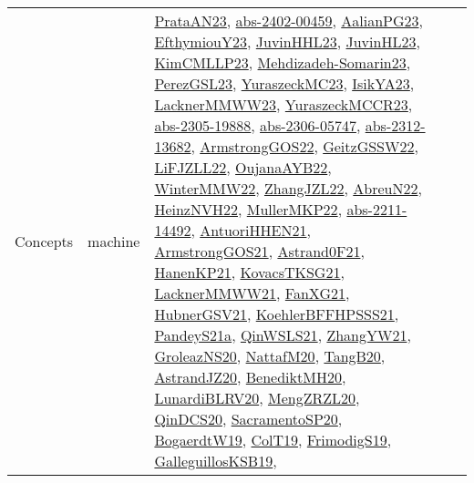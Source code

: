 {\begin{longtable}{llp{6cm}p{6cm}p{6cm}}
Concepts & machine & \href{articles/PrataAN23.pdf}{PrataAN23}\cite{PrataAN23}, \href{articles/abs-2402-00459.pdf}{abs-2402-00459}\cite{abs-2402-00459}, \href{papers/AalianPG23.pdf}{AalianPG23}\cite{AalianPG23}, \href{papers/EfthymiouY23.pdf}{EfthymiouY23}\cite{EfthymiouY23}, \href{papers/JuvinHHL23.pdf}{JuvinHHL23}\cite{JuvinHHL23}, \href{papers/JuvinHL23.pdf}{JuvinHL23}\cite{JuvinHL23}, \href{papers/KimCMLLP23.pdf}{KimCMLLP23}\cite{KimCMLLP23}, \href{papers/Mehdizadeh-Somarin23.pdf}{Mehdizadeh-Somarin23}\cite{Mehdizadeh-Somarin23}, \href{papers/PerezGSL23.pdf}{PerezGSL23}\cite{PerezGSL23}, \href{papers/YuraszeckMC23.pdf}{YuraszeckMC23}\cite{YuraszeckMC23}, \href{articles/IsikYA23.pdf}{IsikYA23}\cite{IsikYA23}, \href{articles/LacknerMMWW23.pdf}{LacknerMMWW23}\cite{LacknerMMWW23}, \href{articles/YuraszeckMCCR23.pdf}{YuraszeckMCCR23}\cite{YuraszeckMCCR23}, \href{articles/abs-2305-19888.pdf}{abs-2305-19888}\cite{abs-2305-19888}, \href{articles/abs-2306-05747.pdf}{abs-2306-05747}\cite{abs-2306-05747}, \href{articles/abs-2312-13682.pdf}{abs-2312-13682}\cite{abs-2312-13682}, \href{papers/ArmstrongGOS22.pdf}{ArmstrongGOS22}\cite{ArmstrongGOS22}, \href{papers/GeitzGSSW22.pdf}{GeitzGSSW22}\cite{GeitzGSSW22}, \href{papers/LiFJZLL22.pdf}{LiFJZLL22}\cite{LiFJZLL22}, \href{papers/OujanaAYB22.pdf}{OujanaAYB22}\cite{OujanaAYB22}, \href{papers/WinterMMW22.pdf}{WinterMMW22}\cite{WinterMMW22}, \href{papers/ZhangJZL22.pdf}{ZhangJZL22}\cite{ZhangJZL22}, \href{articles/AbreuN22.pdf}{AbreuN22}\cite{AbreuN22}, \href{articles/HeinzNVH22.pdf}{HeinzNVH22}\cite{HeinzNVH22}, \href{articles/MullerMKP22.pdf}{MullerMKP22}\cite{MullerMKP22}, \href{articles/abs-2211-14492.pdf}{abs-2211-14492}\cite{abs-2211-14492}, \href{papers/AntuoriHHEN21.pdf}{AntuoriHHEN21}\cite{AntuoriHHEN21}, \href{papers/ArmstrongGOS21.pdf}{ArmstrongGOS21}\cite{ArmstrongGOS21}, \href{papers/Astrand0F21.pdf}{Astrand0F21}\cite{Astrand0F21}, \href{papers/HanenKP21.pdf}{HanenKP21}\cite{HanenKP21}, \href{papers/KovacsTKSG21.pdf}{KovacsTKSG21}\cite{KovacsTKSG21}, \href{papers/LacknerMMWW21.pdf}{LacknerMMWW21}\cite{LacknerMMWW21}, \href{articles/FanXG21.pdf}{FanXG21}\cite{FanXG21}, \href{articles/HubnerGSV21.pdf}{HubnerGSV21}\cite{HubnerGSV21}, \href{articles/KoehlerBFFHPSSS21.pdf}{KoehlerBFFHPSSS21}\cite{KoehlerBFFHPSSS21}, \href{articles/PandeyS21a.pdf}{PandeyS21a}\cite{PandeyS21a}, \href{articles/QinWSLS21.pdf}{QinWSLS21}\cite{QinWSLS21}, \href{articles/ZhangYW21.pdf}{ZhangYW21}\cite{ZhangYW21}, \href{papers/GroleazNS20.pdf}{GroleazNS20}\cite{GroleazNS20}, \href{papers/NattafM20.pdf}{NattafM20}\cite{NattafM20}, \href{papers/TangB20.pdf}{TangB20}\cite{TangB20}, \href{articles/AstrandJZ20.pdf}{AstrandJZ20}\cite{AstrandJZ20}, \href{articles/BenediktMH20.pdf}{BenediktMH20}\cite{BenediktMH20}, \href{articles/LunardiBLRV20.pdf}{LunardiBLRV20}\cite{LunardiBLRV20}, \href{articles/MengZRZL20.pdf}{MengZRZL20}\cite{MengZRZL20}, \href{articles/QinDCS20.pdf}{QinDCS20}\cite{QinDCS20}, \href{articles/SacramentoSP20.pdf}{SacramentoSP20}\cite{SacramentoSP20}, \href{papers/BogaerdtW19.pdf}{BogaerdtW19}\cite{BogaerdtW19}, \href{papers/ColT19.pdf}{ColT19}\cite{ColT19}, \href{papers/FrimodigS19.pdf}{FrimodigS19}\cite{FrimodigS19}, \href{papers/GalleguillosKSB19.pdf}{GalleguillosKSB19}\cite{GalleguillosKSB19}, 
\end{longtable}}
